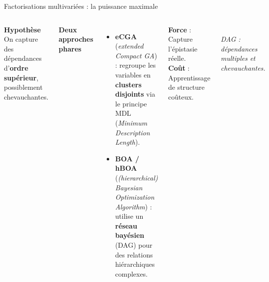 \documentclass[10pt,aspectratio=169]{beamer}
\begin{document}
\begin{frame}{Factorisations multivariées : la puissance maximale}
\begin{columns}[T]
\textbf{Hypothèse}\\[0.1cm]
On capture des dépendances d'\textbf{ordre supérieur}, possiblement chevauchantes.

\vspace{0.2cm}
\textbf{Deux approches phares}
\begin{itemize}
  \item \textbf{eCGA} (\emph{extended Compact GA}) : regroupe les variables en \textbf{clusters disjoints} via le principe MDL (\emph{Minimum Description Length}).
  \item \textbf{BOA / hBOA} (\emph{(hierarchical) Bayesian Optimization Algorithm}) : utilise un \textbf{réseau bayésien} (DAG) pour des relations hiérarchiques complexes.
\end{itemize}

\vspace{0.2cm}
\textbf{Force} : Capture l'épistasie réelle.\\
\textbf{Coût} : Apprentissage de structure coûteux.

\centering
{}\\[0.3cm]
\footnotesize\textit{DAG : dépendances multiples et chevauchantes.}
\end{columns}
\end{frame}
\end{document}
